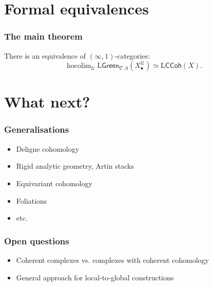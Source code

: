 \documentclass{beamer}
\begin{document}
\section{Formal equivalences}

  \begin{frame}\frametitle{The main theorem}
    \begin{theorem}
      There is an equivalence of $(\infty,1)$-categories:
      \[
        \operatorname{hocolim}_\mathscr{U} \mathrm{L}\mathsf{Green}_{\nabla,0}(X_\bullet^\mathscr{U})
        \simeq
        \mathrm{L}\mathsf{CCoh}(X).
      \]
    \end{theorem}
  \end{frame}


\section{What next?}

  \begin{frame}\frametitle{Generalisations}
    \begin{itemize}
      \item Deligne cohomology
    \pause
      \item Rigid analytic geometry, Artin stacks
      \item Equivariant cohomology
      \item Foliations
      \item etc.
    \end{itemize}
  \end{frame}

  \begin{frame}\frametitle{Open questions}
    \begin{itemize}
      \item Coherent complexes vs. complexes with coherent cohomology
      \item General approach for local-to-global constructions
    \end{itemize}
  \end{frame}
\end{document}
